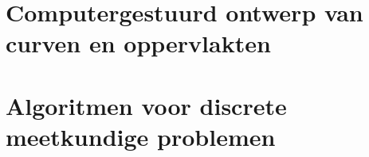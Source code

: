 \documentclass[10pt,a4paper,oneside]{book}
\begin{document}

\tableofcontents

\part{Computergestuurd ontwerp van curven en oppervlakten}





\part{Algoritmen voor discrete meetkundige problemen}







\end{document}
